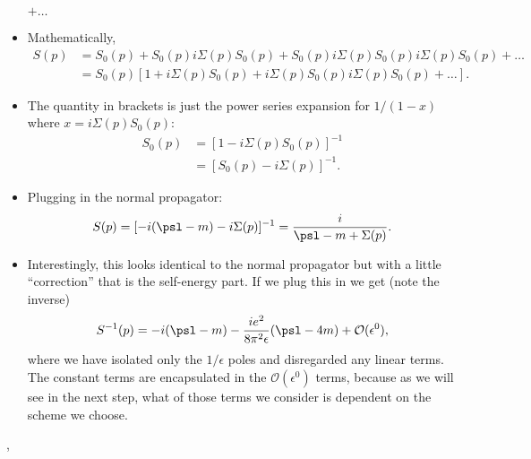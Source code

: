\begin{itemize}
\begin{center}
            $+ \ldots$
        \end{center}
    \item Mathematically,
        \begin{align*}
            S(p) &= S_0(p) + S_0(p) i\Sigma(p) S_0(p) + S_0(p) i\Sigma(p) S_0(p) i\Sigma(p) S_0(p) + \ldots \\
            &= S_0(p) [1 + i\Sigma(p)S_0(p) + i\Sigma(p)S_0(p)i\Sigma(p)S_0(p) + \ldots].
        \end{align*}
    \item The quantity in brackets is just the power series expansion for $1/(1-x)$ where $x = i\Sigma(p)S_0(p)$:
        \begin{align*}
            S_0(p) &= [1 - i\Sigma(p)S_0(p)]^{-1} \\
            &= [S_0(p) - i\Sigma(p)]^{-1}.
        \end{align*}
    \item Plugging in the normal propagator:
        \begin{equation}
            S(p) = [-i(\psl - m) - i\Sigma(p)]^{-1} = \frac{i}{\psl - m + \Sigma(p)}.
        \end{equation}
    \item Interestingly, this looks identical to the normal propagator but with a little ``correction'' that is the self-energy part. If we plug this in we get (note the inverse)
        \begin{equation}
            S^{-1}(p) = -i(\psl - m) - \frac{ie^2}{8\pi^2\epsilon}(\psl - 4m) + \mathcal{O}(\epsilon^0),
        \end{equation}
        where we have isolated only the $1/\epsilon$ poles and disregarded any linear terms. The constant terms are encapsulated in the $\mathcal{O}(\epsilon^0)$ terms, because as we will see in the next step, what of those terms we consider is dependent on the scheme we choose.
\end{itemize}

\sep

